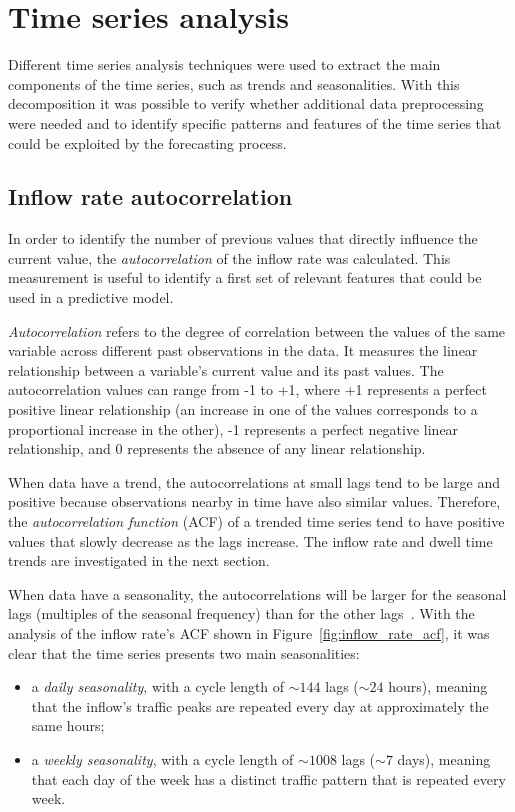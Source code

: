 \section{Time series analysis}
\label{sec:time_series_analysis}

Different time series analysis techniques were used to extract the main components of the time series, such as trends and seasonalities. With this decomposition it was possible to verify whether additional data preprocessing were needed and to identify specific patterns and features of the time series that could be exploited by the forecasting process.

\subsection{Inflow rate autocorrelation}
\label{subsec:inflow_rate_autocorrelation}

In order to identify the number of previous values that directly influence the current value, the \emph{autocorrelation} of the inflow rate was calculated. This measurement is useful to identify a first set of relevant features that could be used in a predictive model.

\emph{Autocorrelation} refers to the degree of correlation between the values of the same variable across different past observations in the data. It measures the linear relationship between a variable's current value and its past values. The autocorrelation values can range from -1 to +1, where +1 represents a perfect positive linear relationship (an increase in one of the values corresponds to a proportional increase in the other), -1 represents a perfect negative linear relationship, and 0 represents the absence of any linear relationship.

When data have a trend, the autocorrelations at small lags tend to be large and positive because observations nearby in time have also similar values. Therefore, the \emph{autocorrelation function} (ACF) of a trended time series tend to have positive values that slowly decrease as the lags increase. The inflow rate and dwell time trends are investigated in the next section.

When data have a seasonality, the autocorrelations will be larger for the seasonal lags (multiples of the seasonal frequency) than for the other lags~\cite{hyndman2018}. With the analysis of the inflow rate's ACF shown in Figure~\ref{fig:inflow_rate_acf}, it was clear that the time series presents two main seasonalities:
\begin{itemize}
  \item a \emph{daily seasonality}, with a cycle length of \( {\sim}144 \) lags (\( {\sim}24 \) hours), meaning that the inflow's traffic peaks are repeated every day at approximately the same hours;
  \item a \emph{weekly seasonality}, with a cycle length of \( {\sim}1008 \) lags (\( {\sim}7 \) days), meaning that each day of the week has a distinct traffic pattern that is repeated every week.
\end{itemize}

